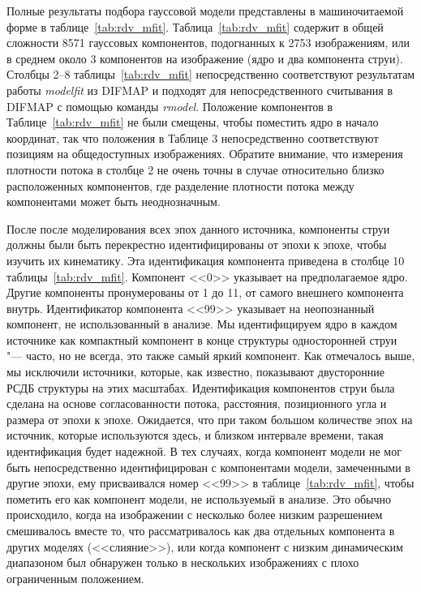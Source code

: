Полные результаты подбора гауссовой модели представлены в машиночитаемой форме в
таблице~\ref{tab:rdv_mfit}. Таблица~\ref{tab:rdv_mfit} содержит в общей сложности 8571 гауссовых
компонентов, подогнанных к 2753 изображениям, или в среднем около 3 компонентов на изображение (ядро
и два компонента струи). Столбцы 2--8 таблицы~\ref{tab:rdv_mfit} непосредственно соответствуют
результатам работы \emph{modelfit} из DIFMAP и подходят для непосредственного считывания в DIFMAP с
помощью команды \emph{rmodel}. Положение компонентов в Таблице~\ref{tab:rdv_mfit} не были смещены,
чтобы поместить ядро в начало координат, так что положения в Таблице 3 непосредственно соответствуют
позициям на общедоступных изображениях. Обратите внимание, что измерения плотности потока в столбце
2 не очень точны в случае относительно близко расположенных компонентов, где разделение плотности
потока между компонентами может быть неоднозначным.

После после моделирования всех эпох данного источника, компоненты струи должны были быть перекрестно
идентифицированы от эпохи к эпохе, чтобы изучить их кинематику. Эта идентификация компонента
приведена в столбце 10 таблицы~\ref{tab:rdv_mfit}. Компонент <<0>> указывает на предполагаемое ядро.
Другие компоненты пронумерованы от 1 до 11, от самого внешнего компонента внутрь. Идентификатор
компонента <<99>> указывает на неопознанный компонент, не использованный в анализе. Мы
идентифицируем ядро ​​в каждом источнике как компактный компонент в конце структуры односторонней
струи "--- часто, но не всегда, это также самый яркий компонент. Как отмечалось выше, мы исключили
источники, которые, как известно, показывают двусторонние РСДБ структуры на этих масштабах.
Идентификация компонентов струи была сделана на основе согласованности потока, расстояния,
позиционного угла и размера от эпохи к эпохе. Ожидается, что при таком большом количестве эпох на
источник, которые используются здесь, и близком интервале времени, такая идентификация будет
надежной. В тех случаях, когда компонент модели не мог быть непосредственно идентифицирован с
компонентами модели, замеченными в другие эпохи, ему присваивался номер <<99>> в
таблице~\ref{tab:rdv_mfit}, чтобы пометить его как компонент модели, не используемый в анализе. Это
обычно происходило, когда на изображении с несколько более низким разрешением смешивалось вместе то,
что рассматривалось как два отдельных компонента в других моделях (<<слияние>>), или когда компонент
с низким динамическим диапазоном был обнаружен только в нескольких изображениях с плохо ограниченным
положением.

